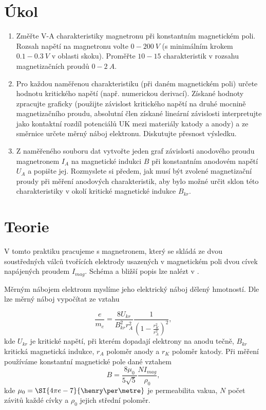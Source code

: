 \documentclass{protokol}
\begin{document}
  \section*{Úkol}

    \begin{enumerate}
      \item Změřte V-A charakteristiky magnetronu při konstantním magnetickém poli. Rozsah napětí na magnetronu volte $0 - \SI{200}{V}$ (s minimálním krokem $\num{0.1}-\SI{0.3}{V}$ v oblasti skoku). Proměřte $10 - 15$ charakteristik v rozsahu magnetizačních proudů $0 - \SI{2}{A}$.
      \item Pro každou naměřenou charakteristiku (při daném magnetickém poli) určete hodnotu kritického napětí (např. numerickou derivací). Získané hodnoty zpracujte graficky (pou\-žijte závislost kritického napětí na druhé mocnině magnetizačního proudu, absolutní člen získané lineární závislosti interpretujte jako kontaktní rozdíl potenciálů UK mezi materiály katody a anody) a ze směrnice určete měrný náboj elektronu. Diskutujte přesnost výsledku.
      \item Z naměřeného souboru dat vytvořte jeden graf závislosti anodového proudu magnetronem $I_A$ na magnetické indukci $B$ při konstantním anodovém napětí $U_A$ a popište jej. Rozmyslete si předem, jak musí být zvolené magnetizační proudy při měření anodových charakteristik, aby bylo možné určit sklon této charakteristiky v okolí kritické magnetické indukce $B_{kr}$.
    \end{enumerate}

  \section*{Teorie}

    V tomto praktiku pracujeme s magnetronem, který se skládá ze dvou soustředných válců tvořících elektrody usazených v magnetickém poli dvou cívek napájených proudem $I_{mag}$. Schéma a bližší popis lze nalézt v \cite{pokyny}.

    Měrným nábojem elektronu myslíme jeho elektrický náboj dělený hmotností.  Dle \cite{pokyny} lze měrný náboj vypočítat ze vztahu

    \begin{equation}
      \frac{e}{m_e} = \frac{ 8 U_{kr} }{ B_{kr}^2 r_A^2 } 
        \frac{ 1 }{ \left( 1 - \frac{ r_K^2 }{ r_A^2 } \right)^2 },
    \end{equation}
    kde $U_{kr}$ je kritické napětí, při kterém dopadají elektrony na anodu tečně, $B_{kr}$ kritická magnetická indukce, $r_A$ poloměr anody a $r_K$ poloměr katody. Při měření používáme konstantní magnetické pole dané vztahem
    \begin{equation}
      B = \frac{ 8 \mu_0 }{ 5 \sqrt{5} } \frac{ N I_{mag} }{ \rho_0 },
    \end{equation}
    kde $\mu_0 = \SI{4 \pi e-7}{\henry\per\metre}$ je permeabilita vakua, $N$ počet závitů každé cívky a $\rho_0$ jejich střední poloměr.
\end{document}
